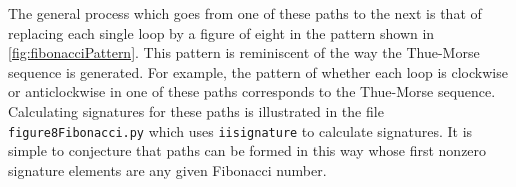 The general process which goes from one of these paths to the next is that of replacing each single loop by a figure of eight in the pattern shown in \autoref{fig:fibonacciPattern}. This pattern is reminiscent of the way the Thue-Morse sequence is generated. For example, the pattern of whether each loop is clockwise or anticlockwise in one of these paths corresponds to the Thue-Morse sequence.
Calculating signatures for these paths is illustrated in the file \verb|figure8Fibonacci.py| which uses \verb|iisignature| to calculate signatures. 
It is simple to conjecture that paths can be formed in this way whose first nonzero signature elements are any given Fibonacci number.


\endDocumentJR
